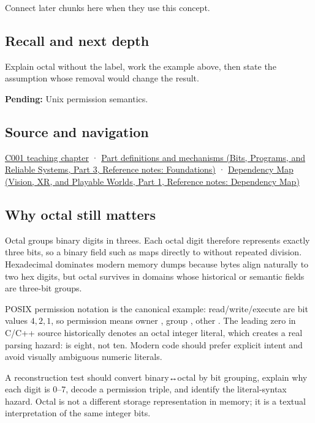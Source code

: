 \hypertarget{appendix-17fc1bc8b305-used-by}{}

Connect later chunks here when they use this concept.

\subsection{Recall and next depth}\label{appendix-17fc1bc8b305-recall-and-next-depth}

\hypertarget{appendix-17fc1bc8b305-recall-and-next-depth}{}

Explain octal without the label, work the example above, then state the assumption whose removal would change the result.

\textbf{Pending:} Unix permission semantics.

\subsection{Source and navigation}\label{appendix-17fc1bc8b305-source-and-navigation}

\hypertarget{appendix-17fc1bc8b305-source-and-navigation}{}

\hyperref[01-foundations-i-ch001-from-a-signal-to-an-interpretation]{C001 teaching chapter} · \href{../01-Bits-Programs-and-Reliable-Systems-P03/main.pdf\#appendix-fd090d982a15}{Part definitions and mechanisms (Bits, Programs, and Reliable Systems, Part 3, Reference notes: Foundations)} · \href{../07-Vision-XR-and-Playable-Worlds-P01/main.pdf\#appendix-4ad47bdd269a}{Dependency Map (Vision, XR, and Playable Worlds, Part 1, Reference notes: Dependency Map)}

\subsection{Why octal still matters}\label{appendix-17fc1bc8b305-why-octal-still-matters}

\hypertarget{appendix-17fc1bc8b305-why-octal-still-matters}{}

Octal groups binary digits in threes. Each octal digit therefore represents exactly three bits, so a binary field such as  maps directly to  without repeated division. Hexadecimal dominates modern memory dumps because bytes align naturally to two hex digits, but octal survives in domains whose historical or semantic fields are three-bit groups.

POSIX permission notation is the canonical example: read/write/execute are bit values \(4,2,1\), so permission  means owner , group , other . The leading zero in C/C++ source historically denotes an octal integer literal, which creates a real parsing hazard:  is eight, not ten. Modern code should prefer explicit intent and avoid visually ambiguous numeric literals.

A reconstruction test should convert binary↔octal by bit grouping, explain why each digit is 0--7, decode a permission triple, and identify the literal-syntax hazard. Octal is not a different storage representation in memory; it is a textual interpretation of the same integer bits.
